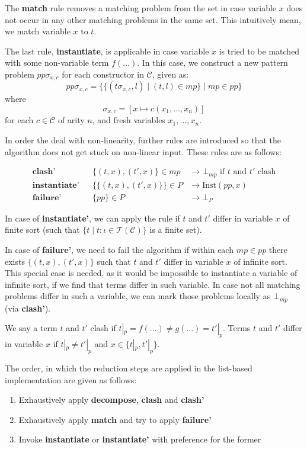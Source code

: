 The \textbf{match} rule removes a matching problem from the set in case variable $x$ does not occur in any other matching problems in the same set. This intuitively mean, we match variable $x$ to $t$.

The last rule, \textbf{instantiate}, is applicable in case variable $x$ is tried to be matched with some non-variable term $f(...)$. In this case, we construct a new pattern problem $pp\sigma_{x,c}$ for each constructor in $\mathcal{C}$, given as:
$$pp\sigma_{x,c} = \{\{ (t\sigma_{x,c},l) \mid (t,l) \in mp\} \mid mp \in pp\}$$
where
$$\sigma_{x,c} = [x \mapsto c(x_1, ..., x_n)]$$ for each $c \in \mathcal{C}$ of arity $n$, and fresh variables $x_1, ..., x_n$.

In order the deal with non-linearity, further rules are introduced so that the algorithm does not get stuck on non-linear input. These rules are as follows:

\begin{align*}
\textbf{clash'} & & \{(t,x), (t',x)\} \in mp &\rightarrow \bot_{mp}\text{ if $t$ and $t'$ clash} \\
\textbf{instantiate'} & & \{\{(t,x), (t',x)\}\} \in P &\rightarrow \text{Inst$(pp,x)$} \\
\textbf{failure'} & & \{pp\} \in P &\rightarrow \bot_P
\end{align*}

In case of \textbf{instantiate'}, we can apply the rule if $t$ and $t'$ differ in variable $x$ of finite sort (such that $\{t \mid t : \iota \in \mathcal{T}(\mathcal{C})\}$ is a finite set).

In case of \textbf{failure'}, we need to fail the algorithm if within each $mp \in pp$ there exists $\{(t,x),(t',x)\}$ such that $t$ and $t'$ differ in variable $x$ of infinite sort. This special case is needed, as it would be impossible to instantiate a variable of infinite sort, if we find that terms differ in such variable. In case not all matching problems differ in such a variable, we can mark those problems locally as $\bot_{mp}$ (via \textbf{clash'}).

We say a term $t$ and $t'$ clash if $t|_p=f(...) \neq g(...)=t'|_p$. Terms $t$ and $t'$ differ in variable $x$ if $t|_p \neq t'|_p$ and $x \in \{t|_p, t'|_p\}$.

The order, in which the reduction steps are applied in the list-based implementation are given as follows:
\begin{enumerate}
    \item Exhaustively apply \textbf{decompose}, \textbf{clash} and \textbf{clash'}
    \item Exhaustively apply \textbf{match} and try to apply \textbf{failure'}
    \item Invoke \textbf{instantiate} or \textbf{instantiate'} with preference for the former
\end{enumerate}

